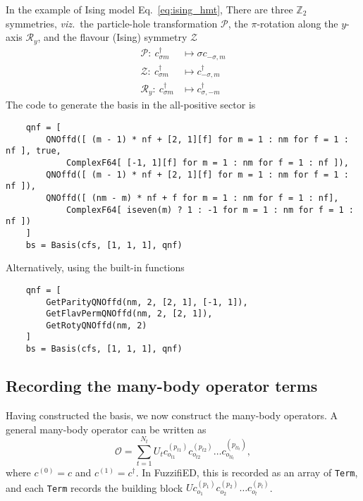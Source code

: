 \documentclass{timesjhep}
\begin{document}
In the example of Ising model Eq.~\eqref{eq:ising_hmt}, There are three $\mathbb{Z}_2$ symmetries, \textit{viz.}~the particle-hole transformation $\mathcal{P}$, the $\pi$-rotation along the $y$-axis $\mathcal{R}_y$, and the flavour (Ising) symmetry $\mathcal{Z}$
\begin{align}
    \mathcal{P}:\ c^\dagger_{\sigma m}&\mapsto\sigma c_{-\sigma,m}\nonumber\\
    \mathcal{Z}:\ c^\dagger_{\sigma m}&\mapsto c^\dagger_{-\sigma,m}\nonumber\\
    \mathcal{R}_y:\ c^\dagger_{\sigma m}&\mapsto c^\dagger_{\sigma,-m}
\end{align}
The code to generate the basis in the all-positive sector is
\begin{lstlisting}
    qnf = [
        QNOffd([ (m - 1) * nf + [2, 1][f] for m = 1 : nm for f = 1 : nf ], true,
            ComplexF64[ [-1, 1][f] for m = 1 : nm for f = 1 : nf ]),
        QNOffd([ (m - 1) * nf + [2, 1][f] for m = 1 : nm for f = 1 : nf ]),
        QNOffd([ (nm - m) * nf + f for m = 1 : nm for f = 1 : nf],
            ComplexF64[ iseven(m) ? 1 : -1 for m = 1 : nm for f = 1 : nf ])
    ]
    bs = Basis(cfs, [1, 1, 1], qnf)
\end{lstlisting}
Alternatively, using the built-in functions
\begin{lstlisting}
    qnf = [
        GetParityQNOffd(nm, 2, [2, 1], [-1, 1]),
        GetFlavPermQNOffd(nm, 2, [2, 1]),
        GetRotyQNOffd(nm, 2)
    ]
    bs = Basis(cfs, [1, 1, 1], qnf)
\end{lstlisting}

\subsection{Recording the many-body operator terms}
\label{sec:ed_term}

Having constructed the basis, we now construct the many-body operators. A general many-body operator can be written as
\begin{equation}
    \mathcal{O} =\sum_{t=1}^{N_t}U_tc^{(p_{t1})}_{o_{t1}}c^{(p_{t2})}_{o_{t2}}\dots c^{(p_{tl_t})}_{o_{tl_t}},
\end{equation}
where $c^{(0)}=c$ and $c^{(1)}=c^\dagger$. In FuzzifiED, this is recorded as an array of \lstinline|Term|, and each \lstinline|Term| records the building block $Uc^{(p_{1})}_{o_{1}}c^{(p_{2})}_{o_{2}}\dots c^{(p_{l})}_{o_{l}}$.
\end{document}
